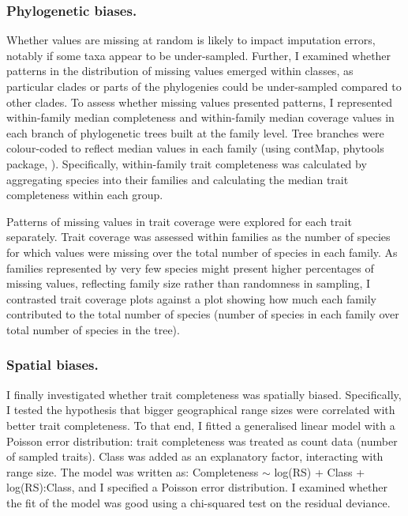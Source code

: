 \subsubsection{Phylogenetic biases.}
Whether values are missing at random is likely to impact imputation errors, notably if some taxa appear to be under-sampled. Further, I examined whether patterns in the distribution of missing values emerged within classes, as particular clades or parts of the phylogenies could be under-sampled compared to other clades. To assess whether missing values presented patterns, I represented within-family median completeness and within-family median coverage values in each branch of phylogenetic trees built at the family level. Tree branches were colour-coded to reflect median values in each family (using contMap, phytools package, \cite{Revell2016}). Specifically, within-family trait completeness was calculated by aggregating species into their families and calculating the median trait completeness within each group. 

Patterns of missing values in trait coverage were explored for each trait separately. Trait coverage was assessed within families as the number of species for which values were missing over the total number of species in each family. As families represented by very few species might present higher percentages of missing values, reflecting family size rather than randomness in sampling, I contrasted trait coverage plots against a plot showing how much each family contributed to the total number of species (number of species in each family over total number of species in the tree).

\subsubsection{Spatial biases.} I finally investigated whether trait completeness was spatially biased. Specifically, I tested the hypothesis that bigger geographical range sizes were correlated with better trait completeness. To that end, I fitted a generalised linear model with a Poisson error distribution: trait completeness was treated as count data (number of sampled traits). Class was added as an explanatory factor, interacting with range size. The model was written as: Completeness $\sim$ log(RS) + Class + log(RS):Class, and I specified a Poisson error distribution. I examined whether the fit of the model was good using a chi-squared test on the residual deviance.\\

